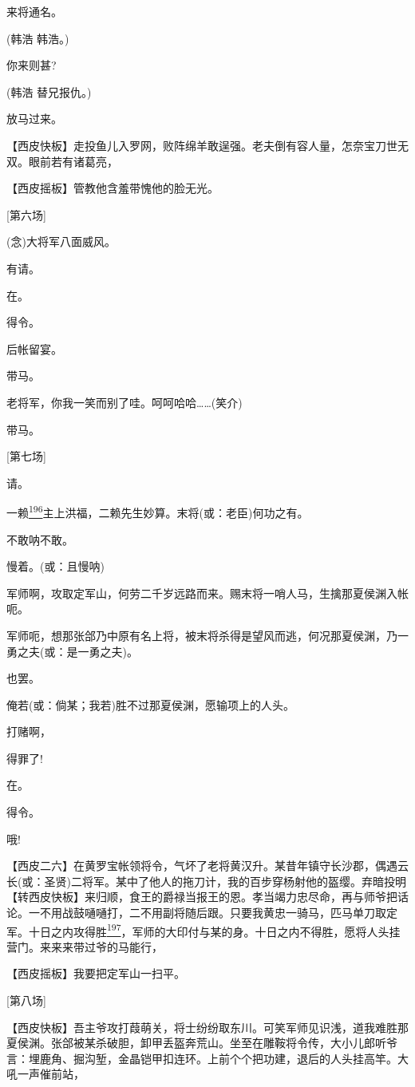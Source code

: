 来将通名。

(韩浩 韩浩。)

你来则甚?

(韩浩 替兄报仇。)

放马过来。

【西皮快板】走投鱼儿入罗网，败阵绵羊敢逞强。老夫倒有容人量，怎奈宝刀世无双。眼前若有诸葛亮，

【西皮摇板】管教他含羞带愧他的脸无光。

{[}第六场{]}

(念)大将军八面威风。

有请。

在。

得令。

后帐留宴。

带马。

老将军，你我一笑而别了哇。呵呵哈哈\ldots{}\ldots{}(笑介)

带马。

{[}第七场{]}

请。

一赖\protect\hyperlink{fn196}{\textsuperscript{196}}主上洪福，二赖先生妙算。末将(或：老臣)何功之有。

不敢呐不敢。

慢着。(或：且慢呐)

军师啊，攻取定军山，何劳二千岁远路而来。赐末将一哨人马，生擒那夏侯渊入帐呃。

军师呃，想那张郃乃中原有名上将，被末将杀得是望风而逃，何况那夏侯渊，乃一勇之夫(或：是一勇之夫)。

也罢。

俺若(或：倘某；我若)胜不过那夏侯渊，愿输项上的人头。

打赌啊，

得罪了!

在。

得令。

哦!

【西皮二六】在黄罗宝帐领将令，气坏了老将黄汉升。某昔年镇守长沙郡，偶遇云长(或：圣贤)二将军。某中了他人的拖刀计，我的百步穿杨射他的盔缨。弃暗投明【转西皮快板】来归顺，食王的爵禄当报王的恩。孝当竭力忠尽命，再与师爷把话论。一不用战鼓嗵嗵打，二不用副将随后跟。只要我黄忠一骑马，匹马单刀取定军。十日之内攻得胜\protect\hyperlink{fn197}{\textsuperscript{197}}，军师的大印付与某的身。十日之内不得胜，愿将人头挂营门。来来来带过爷的马能行，

【西皮摇板】我要把定军山一扫平。

{[}第八场{]}

【西皮快板】吾主爷攻打葭萌关，将士纷纷取东川。可笑军师见识浅，道我难胜那夏侯渊。张郃被某杀破胆，卸甲丢盔奔荒山。坐至在雕鞍将令传，大小儿郎听爷言：埋鹿角、掘沟堑，金晶铠甲扣连环。上前个个把功建，退后的人头挂高竿。大吼一声催前站，

